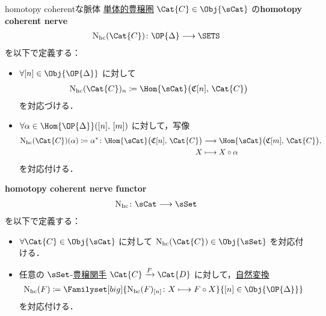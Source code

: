 \documentclass[TQFT_main]{subfiles}
\begin{document}
\begin{mydef}[label=def:nerve-hc]{homotopy coherentな脈体}
    \hyperref[def:SimpCat]{単体的豊穣圏} $\Cat{C} \in \Obj{\sCat}$ の\textbf{homotopy coherent nerve}
    \begin{align}
        \mathrm{N}_{\text{hc}}(\Cat{C}) \colon \OP{\Delta} \lto \SETS
    \end{align}
    を以下で定義する：
    \begin{itemize}
        \item $\forall [n] \in \Obj{\OP{\Delta}}$ に対して
        \begin{align}
            \mathrm{N}_{\text{hc}}(\Cat{C})_n &\coloneqq \Hom{\sCat} \bigl( \mathfrak{C}[n],\, \Cat{C} \bigr) 
        \end{align}
        を対応づける．
        \item $\forall \alpha \in \Hom{\OP{\Delta}}([n],\, [m])$ に対して，写像
        \begin{align}
            \mathrm{N}_{\text{hc}}(\Cat{C})(\alpha) \coloneqq \alpha^* \colon \Hom{\sCat} \bigl( \mathfrak{C}[n],\, \Cat{C} \bigr) &\lto \Hom{\sCat} \bigl( \mathfrak{C}[m],\, \Cat{C} \bigr), \\
            X &\lmto X \circ \alpha
        \end{align}
        を対応付ける．
    \end{itemize}
    
    \tcblower

    \textbf{homotopy coherent nerve functor}
    \begin{align}
        \mathrm{N}_{\text{hc}} \colon \sCat \lto \sSet
    \end{align}
    を以下で定義する：
    \begin{itemize}
        \item $\forall \Cat{C} \in \Obj{\sCat}$ に対して $\mathrm{N}_{\text{hc}}(\Cat{C}) \in \Obj{\sSet}$ を対応付ける．
        \item 任意の $\sSet$-\hyperref[def:enriched-functor]{豊穣関手} $\Cat{C} \xrightarrow{F} \Cat{D}$ に対して，\hyperref[def:nat]{自然変換}
        \begin{align}
            \mathrm{N}_{\text{hc}} (F) \coloneqq \Familyset[big]{\mathrm{N}_{\text{hc}}(F)_{[n]} \colon X \lmto F \circ X}{[n] \in \Obj{\OP{\Delta}}}
        \end{align}
        を対応付ける．
    \end{itemize}
\end{mydef}
\end{document}
